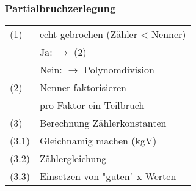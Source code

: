 \subsubsection{Partialbruchzerlegung}
    \begin{tabular}{ll}
        (1) & echt gebrochen (Zähler < Nenner) \\
            & Ja: $\rightarrow$ (2) \\
            & Nein: $\rightarrow$ Polynomdivision \\
        (2) & Nenner faktorisieren \\
            & pro Faktor ein Teilbruch \\
        (3) & Berechnung Zählerkonstanten \\
        (3.1) & Gleichnamig machen (kgV) \\
        (3.2) & Zählergleichung \\
        (3.3) & Einsetzen von "guten"  x-Werten \\			
    \end{tabular}
    

